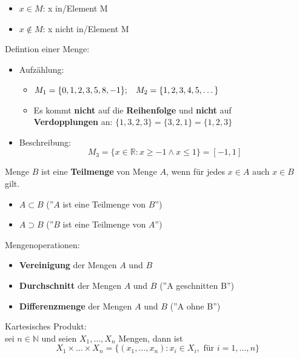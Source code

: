 \documentclass[12pt]{article}
\begin{document}
\begin{itemize}
    \item $x \in M$: x in/Element M
    \item $x \notin M$: x nicht in/Element M
\end{itemize}
\vspace{1ex}
Defintion einer Menge:
\begin{itemize}
    \item Aufzählung:
    \begin{itemize}
        \item[] $M_1 = \{0, 1, 2, 3, 5, 8, -1\}; \hspace{2ex} M_2 = \{1, 2, 3, 4, 5, \dots\}$
        \item[] Es kommt \textbf{nicht} auf die \textbf{Reihenfolge} und \textbf{nicht} auf \\ \textbf{Verdopplungen} an:
        $\{1, 3, 2, 3\} = \{3, 2, 1\} = \{1, 2, 3\}$
    \end{itemize}
    \item Beschreibung:
    \[M_3 = \{x \in \mathbb{R} : x \geq -1 \land x \leq 1\} = [-1, 1]\]
\end{itemize}
\vspace{1ex}
Menge $B$ ist eine \textbf{Teilmenge} von Menge $A$, wenn für jedes $x \in A$ auch $x \in B$ gilt.
\begin{itemize}
    \item $A \subset B$ (''$A$ ist eine Teilmenge von $B$'')
    \item $A \supset B$ (''$B$ ist eine Teilmenge von $A$'')
\end{itemize}
\vspace{1ex}
Mengenoperationen:
\begin{itemize}
    \item \textbf{Vereinigung} der Mengen $A$ und $B$
    \item \textbf{Durchschnitt} der Mengen $A$ und $B$
     (''A geschnitten B'')
    \item \textbf{Differenzmenge} der Mengen $A$ und $B$
     (''A ohne B'')
\end{itemize}
\vspace{1ex}
Kartesisches Produkt: \\
sei $n \in \mathbb{N}$ und seien $X_1, \dots, X_n$ Mengen, dann ist
\[X_1 \times \dots \times X_n = \{(x_1, \dots, x_n) : x_i \in X_i, \text{ für } i = 1,\dots,n\}\]
\end{document}
